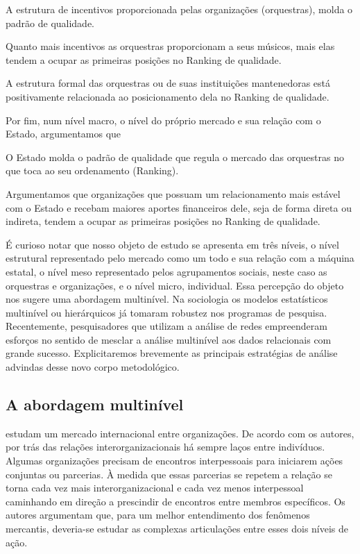 \documentclass[a4paper, 12pt, openright, oneside, german, french, english, brazil]{abntex2}
\begin{document}
	\begin{hip}
		A estrutura de incentivos proporcionada pelas organizações (orquestras), molda o padrão de qualidade.
	\end{hip}

	Quanto mais incentivos as orquestras proporcionam a seus músicos, mais elas tendem a ocupar as primeiras posições no Ranking de qualidade.

	\begin{hip}
		A estrutura formal das orquestras ou de suas instituições mantenedoras está positivamente relacionada ao posicionamento dela no Ranking de qualidade.
	\end{hip}

	Por fim, num nível macro, o nível do próprio mercado e sua relação com o Estado, argumentamos que

	\begin{hip}
		O Estado molda o padrão de qualidade que regula o mercado das orquestras no que toca ao seu ordenamento (Ranking).
	\end{hip}

	Argumentamos que organizações que possuam um relacionamento mais estável com o Estado e recebam maiores aportes financeiros dele, seja de forma direta ou indireta, tendem a ocupar as primeiras posições no Ranking de qualidade.


	É curioso notar que nosso objeto de estudo se apresenta em três níveis, o nível estrutural representado pelo mercado como um todo e sua relação com a máquina estatal, o nível meso representado pelos agrupamentos sociais, neste caso as orquestras e organizações, e o nível micro, individual. Essa percepção do objeto nos sugere uma abordagem multinível. Na sociologia os modelos estatísticos multinível ou hierárquicos já tomaram robustez nos programas de pesquisa. Recentemente, pesquisadores que utilizam a análise de redes empreenderam esforços no sentido de mesclar a análise multinível aos dados relacionais com grande sucesso. Explicitaremos brevemente as principais estratégias de análise advindas desse novo corpo metodológico.

	\subsection{A abordagem multinível}

	 estudam um mercado internacional entre organizações. De acordo com os autores, por trás das relações interorganizacionais há sempre laços entre indivíduos. Algumas organizações precisam de encontros interpessoais para iniciarem ações conjuntas ou parcerias. À medida que essas parcerias se repetem a relação se torna cada vez mais interorganizacional e cada vez menos interpessoal caminhando em direção a prescindir de encontros entre membros específicos. Os autores argumentam que, para um melhor entendimento dos fenômenos mercantis, deveria-se estudar as complexas articulações entre esses dois níveis de ação.
\end{document}
